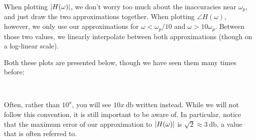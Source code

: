 \documentclass[letterpaper]{article}
\theoremstyle{remark}
\DeclarePairedDelimiter\abs{\lvert}{\rvert}%
\begin{document}
When plotting $\abs{H(\omega)}$, we don't worry too much about the inaccuracies near $\omega_p$, and just draw the two approximations together. When plotting $\angle{H(\omega)}$, however, we only use our approximations for $\omega < \omega_p/10$ and $\omega > 10\omega_p$. Between those two values, we linearly interpolate between both approximations (though on a log-linear scale).

Both these plots are presented below, though we have seen them many times before:
\begin{figure*}[h]
    \centering
    \begin{subfigure}[t]{0.5\textwidth}
    \begin{center}
    \end{center}
    \end{subfigure}%
    ~ 
    \begin{subfigure}[t]{0.5\textwidth}
    \begin{center}
    \end{center}
    \end{subfigure}
\end{figure*}

Often, rather than $10^x$, you will see $10x\SI{}{\decibel}$ written instead. While we will not follow this convention, it is still important to be aware of. In particular, notice that the maximum error of our approximation to $\abs{H(\omega)}$ is $\sqrt{2} \approx \SI{3}{\decibel}$, a value that is often referred to.
\end{document}
